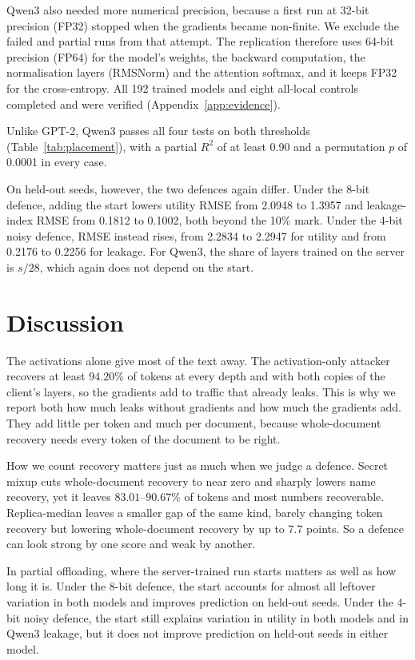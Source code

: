 \documentclass[11pt]{article}
\begin{document}
Qwen3 also needed more numerical precision, because a first run at 32-bit precision (FP32) stopped when the gradients became non-finite. We exclude the failed and partial runs from that attempt. The replication therefore uses 64-bit precision (FP64) for the model's weights, the backward computation, the normalisation layers (RMSNorm) and the attention softmax, and it keeps FP32 for the cross-entropy. All 192 trained models and eight all-local controls completed and were verified (Appendix~\ref{app:evidence}).

Unlike GPT-2, Qwen3 passes all four tests on both thresholds (Table~\ref{tab:placement}), with a partial $R^2$ of at least 0.90 and a permutation $p$ of 0.0001 in every case.

On held-out seeds, however, the two defences again differ. Under the 8-bit defence, adding the start lowers utility RMSE from 2.0948 to 1.3957 and leakage-index RMSE from 0.1812 to 0.1002, both beyond the 10\% mark. Under the 4-bit noisy defence, RMSE instead rises, from 2.2834 to 2.2947 for utility and from 0.2176 to 0.2256 for leakage. For Qwen3, the share of layers trained on the server is $s/28$, which again does not depend on the start.


\section{Discussion}
\label{sec:discussion}
The activations alone give most of the text away. The activation-only attacker recovers at least $94.20\%$ of tokens at every depth and with both copies of the client's layers, so the gradients add to traffic that already leaks. This is why we report both how much leaks without gradients and how much the gradients add. They add little per token and much per document, because whole-document recovery needs every token of the document to be right.

How we count recovery matters just as much when we judge a defence. Secret mixup cuts whole-document recovery to near zero and sharply lowers name recovery, yet it leaves $83.01$--$90.67\%$ of tokens and most numbers recoverable. Replica-median leaves a smaller gap of the same kind, barely changing token recovery but lowering whole-document recovery by up to $7.7$ points. So a defence can look strong by one score and weak by another.

In partial offloading, where the server-trained run starts matters as well as how long it is. Under the 8-bit defence, the start accounts for almost all leftover variation in both models and improves prediction on held-out seeds. Under the 4-bit noisy defence, the start still explains variation in utility in both models and in Qwen3 leakage, but it does not improve prediction on held-out seeds in either model.
\end{document}
